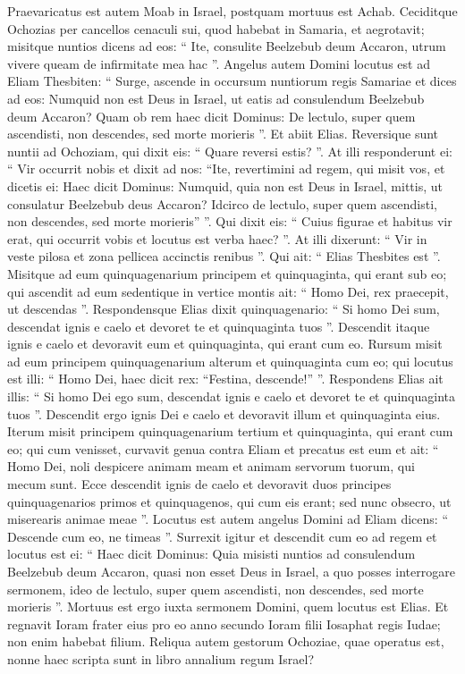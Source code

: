 \begin{biblechapter}
 \verse Praevaricatus est autem Moab in Israel, postquam mortuus est Achab. 
\verse Ceciditque Ochozias per cancellos cenaculi sui, quod habebat in Samaria, et aegrotavit; misitque nuntios dicens ad eos: “ Ite, consulite Beelzebub deum Accaron, utrum vivere queam de infirmitate mea hac ”.
 \verse Angelus autem Domini locutus est ad Eliam Thesbiten: “ Surge, ascende in occursum nuntiorum regis Samariae et dices ad eos: Numquid non est Deus in Israel, ut eatis ad consulendum Beelzebub deum Accaron? 
\verse Quam ob rem haec dicit Dominus: De lectulo, super quem ascendisti, non descendes, sed morte morieris ”. Et abiit Elias. 
\verse Reversique sunt nuntii ad Ochoziam, qui dixit eis: “ Quare reversi estis? ”. 
\verse At illi responderunt ei: “ Vir occurrit nobis et dixit ad nos: “Ite, revertimini ad regem, qui misit vos, et dicetis ei: Haec dicit Dominus: Numquid, quia non est Deus in Israel, mittis, ut consulatur Beelzebub deus Accaron? Idcirco de lectulo, super quem ascendisti, non descendes, sed morte morieris” ”. 
\verse Qui dixit eis: “ Cuius figurae et habitus vir erat, qui occurrit vobis et locutus est verba haec? ”. 
\verse At illi dixerunt: “ Vir in veste pilosa et zona pellicea accinctis renibus ”. Qui ait: “ Elias Thesbites est ”.
 \verse Misitque ad eum quinquagenarium principem et quinquaginta, qui erant sub eo; qui ascendit ad eum sedentique in vertice montis ait: “ Homo Dei, rex praecepit, ut descendas ”. 
\verse Respondensque Elias dixit quinquagenario: “ Si homo Dei sum, descendat ignis e caelo et devoret te et quinquaginta tuos ”. Descendit itaque ignis e caelo et devoravit eum et quinquaginta, qui erant cum eo. 
\verse Rursum misit ad eum principem quinquagenarium alterum et quinquaginta cum eo; qui locutus est illi: “ Homo Dei, haec dicit rex: “Festina, descende!” ”. 
\verse Respondens Elias ait illis: “ Si homo Dei ego sum, descendat ignis e caelo et devoret te et quinquaginta tuos ”. Descendit ergo ignis Dei e caelo et devoravit illum et quinquaginta eius. 
\verse Iterum misit principem quinquagenarium tertium et quinquaginta, qui erant cum eo; qui cum venisset, curvavit genua contra Eliam et precatus est eum et ait: “ Homo Dei, noli despicere animam meam et animam servorum tuorum, qui mecum sunt. 
\verse Ecce descendit ignis de caelo et devoravit duos principes quinquagenarios primos et quinquagenos, qui cum eis erant; sed nunc obsecro, ut miserearis animae meae ”.
 \verse Locutus est autem angelus Domini ad Eliam dicens: “ Descende cum eo, ne timeas ”. Surrexit igitur et descendit cum eo ad regem 
\verse et locutus est ei: “ Haec dicit Dominus: Quia misisti nuntios ad consulendum Beelzebub deum Accaron, quasi non esset Deus in Israel, a quo posses interrogare sermonem, ideo de lectulo, super quem ascendisti, non descendes, sed morte morieris ”.
 \verse Mortuus est ergo iuxta sermonem Domini, quem locutus est Elias. Et regnavit Ioram frater eius pro eo anno secundo Ioram filii Iosaphat regis Iudae; non enim habebat filium. 
\verse Reliqua autem gestorum Ochoziae, quae operatus est, nonne haec scripta sunt in libro annalium regum Israel?
 

\end{biblechapter}
